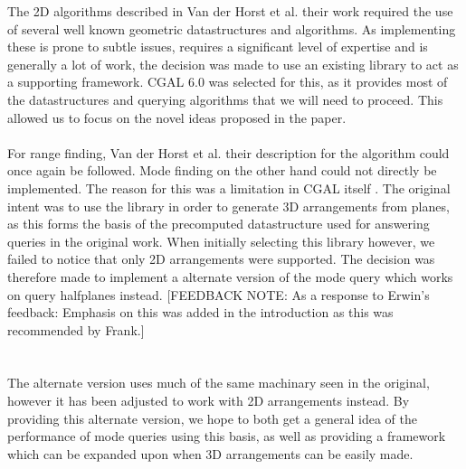 \documentclass{article}
\newcommand{\fbnote}[1]{{\color{blue}[FEEDBACK NOTE: #1]\\}}
\begin{document}
The 2D algorithms described in Van der Horst et al. their work required the use
of several well known geometric datastructures and algorithms. As implementing
these is prone to subtle issues, requires a significant level of expertise and
is generally a lot of work, the decision was made to use an existing library to
act as a supporting framework. CGAL 6.0 \cite{cgal:foundations} was selected
for this, as it provides most of the datastructures and querying algorithms
that we will need to proceed. This allowed us to focus on the novel ideas
proposed in the paper. \\\\ For range finding, Van der Horst et al. their
description for the algorithm could once again be followed. Mode finding on the
other hand could not directly be implemented. The reason for this was a
limitation in CGAL itself \cite{cgal:arrangement}. The original intent was to
use the library in order to generate 3D arrangements from planes, as this forms
the basis of the precomputed datastructure used for answering queries in the
original work. When initially selecting this library however, we failed to
notice that only 2D arrangements were supported. The decision was therefore
made to implement a alternate version of the mode query which works on query
halfplanes instead. \fbnote{As a response to Erwin's feedback: Emphasis on this was added in the introduction as this was recommended by Frank.}
\\\\ The alternate version uses much of the same machinary
seen in the original, however it has been adjusted to work with 2D arrangements
instead. By providing this alternate version, we hope to both get a general
idea of the performance of mode queries using this basis, as well as providing
a framework which can be expanded upon when 3D arrangements can be easily made.
\end{document}
